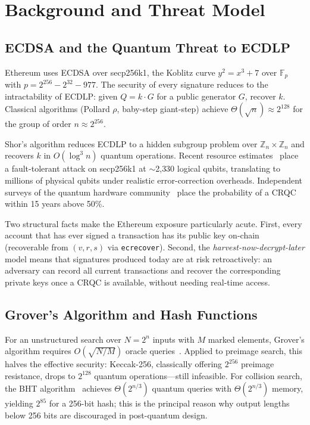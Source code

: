 \documentclass[journal,onecolumn,11pt]{IEEEtran}
\begin{document}
\section{Background and Threat Model}
\label{sec:background}

\subsection{ECDSA and the Quantum Threat to ECDLP}
\label{sec:bg_ecdsa}

Ethereum uses ECDSA over secp256k1, the Koblitz curve $y^2 = x^3 + 7$ over $\mathbb{F}_p$ with $p = 2^{256} - 2^{32} - 977$. The security of every signature reduces to the intractability of ECDLP: given $Q = k \cdot G$ for a public generator $G$, recover $k$. Classical algorithms (Pollard $\rho$, baby-step giant-step) achieve $\Theta(\sqrt{n}) \approx 2^{128}$ for the group of order $n \approx 2^{256}$.

Shor's algorithm reduces ECDLP to a hidden subgroup problem over $\mathbb{Z}_n \times \mathbb{Z}_n$ and recovers $k$ in $O(\log^3 n)$ quantum operations. Recent resource estimates~\cite{taguchi2025coordinates} place a fault-tolerant attack on secp256k1 at $\sim$2{,}330 logical qubits, translating to millions of physical qubits under realistic error-correction overheads. Independent surveys of the quantum hardware community~\cite{mosca2023quantum} place the probability of a CRQC within 15 years above 50\%.

Two structural facts make the Ethereum exposure particularly acute. First, every account that has ever signed a transaction has its public key on-chain (recoverable from $(v,r,s)$ via \texttt{ecrecover}). Second, the \emph{harvest-now-decrypt-later} model means that signatures produced today are at risk retroactively: an adversary can record all current transactions and recover the corresponding private keys once a CRQC is available, without needing real-time access.

\subsection{Grover's Algorithm and Hash Functions}
\label{sec:bg_grover}

For an unstructured search over $N = 2^n$ inputs with $M$ marked elements, Grover's algorithm requires $O(\sqrt{N/M})$ oracle queries~\cite{grover1996}. Applied to preimage search, this halves the effective security: Keccak-256, classically offering $2^{256}$ preimage resistance, drops to $2^{128}$ quantum operations---still infeasible. For collision search, the BHT algorithm~\cite{brassard1997bht} achieves $\Theta(2^{n/3})$ quantum queries with $\Theta(2^{n/3})$ memory, yielding $2^{85}$ for a 256-bit hash; this is the principal reason why output lengths below 256 bits are discouraged in post-quantum design.
\end{document}
